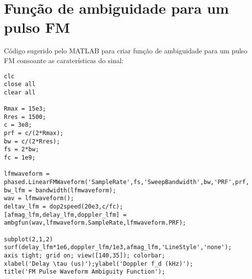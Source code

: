 
\chapter{Função de ambiguidade para um pulso FM} %

\label{Annex1} %

Código sugerido pelo MATLAB para criar função de ambiguidade para um pulso FM consoante as caraterísticas do sinal:

\begin{verbatim}
clc
close all
clear all

Rmax = 15e3;
Rres = 1500;
c = 3e8;
prf = c/(2*Rmax);
bw = c/(2*Rres);
fs = 2*bw;
fc = 1e9;

lfmwaveform = phased.LinearFMWaveform('SampleRate',fs,'SweepBandwidth',bw,'PRF',prf,'PulseWidth',5/bw);
bw_lfm = bandwidth(lfmwaveform);
wav = lfmwaveform();
deltav_lfm = dop2speed(20e3,c/fc);
[afmag_lfm,delay_lfm,doppler_lfm] = ambgfun(wav,lfmwaveform.SampleRate,lfmwaveform.PRF);

subplot(2,1,2)  
surf(delay_lfm*1e6,doppler_lfm/1e3,afmag_lfm,'LineStyle','none'); 
axis tight; grid on; view([140,35]); colorbar;
xlabel('Delay \tau (us)');ylabel('Doppler f_d (kHz)');
title('FM Pulse Waveform Ambiguity Function');
\end{verbatim}